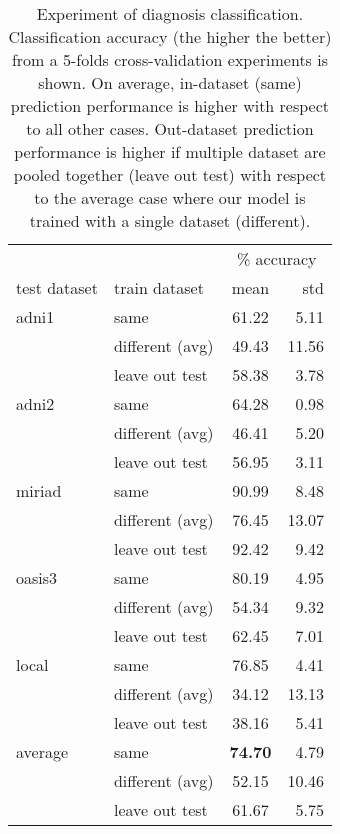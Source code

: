 \begin{table}
\centering
\caption{
Experiment of diagnosis classification.
Classification accuracy (the higher the better) from a 5-folds cross-validation experiments is shown.
On average, in-dataset (same) prediction performance is higher with respect to all other cases.
Out-dataset prediction performance is higher if multiple dataset are pooled together (leave out test) with respect to the 
average case where our model is trained with a single dataset (different).
}
\begin{tabular}{llcr}
\toprule
       &      &            \multicolumn{2}{c}{\% accuracy} \\
test dataset & train dataset & mean & std \\
\midrule
adni1  & same            &  61.22 & 5.11 \\
       & different (avg) &  49.43 & 11.56 \\
       & leave out test  &  58.38 & 3.78 \\
\midrule
adni2  & same            &  64.28 & 0.98 \\
       & different (avg) &  46.41 & 5.20 \\
       & leave out test  &  56.95 & 3.11 \\
\midrule
miriad & same            &  90.99 & 8.48 \\
       & different (avg) &  76.45 & 13.07 \\
       & leave out test  &  92.42 & 9.42 \\
\midrule
oasis3 & same            &  80.19 & 4.95 \\
       & different (avg) &  54.34 & 9.32 \\
       & leave out test  &  62.45 & 7.01 \\
\midrule
local  & same            &  76.85 & 4.41 \\
       & different (avg) &  34.12 & 13.13 \\
       & leave out test  &  38.16 & 5.41 \\
\midrule
\midrule
average& same            &  \textbf{74.70} & 4.79 \\
       & different (avg) &  52.15 & 10.46 \\
       & leave out test  &  61.67 & 5.75 \\
\bottomrule
\end{tabular}
\end{table}

